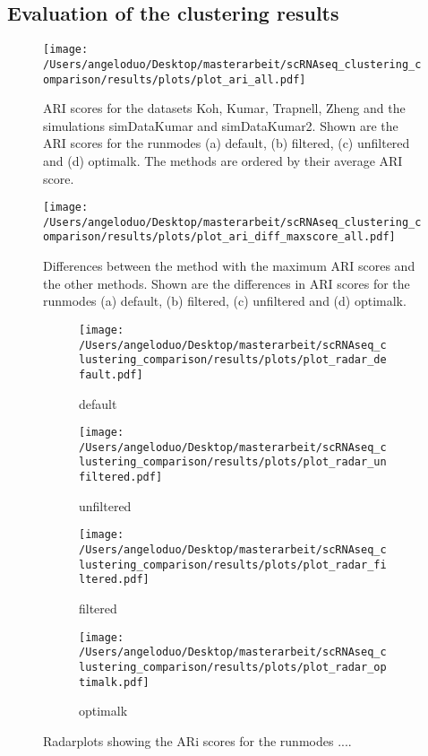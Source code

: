 \documentclass[12pt, a4paper]{article}\usepackage[]{graphicx}\usepackage[]{color}
\begin{document}
\subsection{Evaluation of the clustering results}
\begin{figure}[!h]
\texttt{[image: /Users/angeloduo/Desktop/masterarbeit/scRNAseq\_clustering\_comparison/results/plots/plot\_ari\_all.pdf]}
\caption{ARI scores for the datasets Koh, Kumar, Trapnell, Zheng and the simulations simDataKumar and simDataKumar2. Shown are the ARI scores for the runmodes (a) default, (b) filtered, (c) unfiltered and (d) optimalk. The methods are ordered by their average ARI score. }
\label{fig:ariall}
\end{figure}


\begin{figure}[!h]
\texttt{[image: /Users/angeloduo/Desktop/masterarbeit/scRNAseq\_clustering\_comparison/results/plots/plot\_ari\_diff\_maxscore\_all.pdf]}
\caption{Differences between the method with the maximum ARI scores and the other methods. Shown are the differences in ARI scores for the runmodes (a) default, (b) filtered, (c) unfiltered and (d) optimalk.  }
\label{fig:aridiff1}
\end{figure}

\begin{figure}
\centering
\begin{subfigure}{.5\textwidth}
  \centering
  \texttt{[image: /Users/angeloduo/Desktop/masterarbeit/scRNAseq\_clustering\_comparison/results/plots/plot\_radar\_default.pdf]}
  \caption{default}
  \label{fig:radd}
\end{subfigure}%
\begin{subfigure}{.5\textwidth}
  \centering
  \texttt{[image: /Users/angeloduo/Desktop/masterarbeit/scRNAseq\_clustering\_comparison/results/plots/plot\_radar\_unfiltered.pdf]}
  \caption{unfiltered}
  \label{fig:radu}
\end{subfigure}
\begin{subfigure}{.5\textwidth}
  \centering
  \texttt{[image: /Users/angeloduo/Desktop/masterarbeit/scRNAseq\_clustering\_comparison/results/plots/plot\_radar\_filtered.pdf]}
  \caption{filtered}
  \label{fig:radf}
\end{subfigure}%
\begin{subfigure}{.5\textwidth}
  \centering
  \texttt{[image: /Users/angeloduo/Desktop/masterarbeit/scRNAseq\_clustering\_comparison/results/plots/plot\_radar\_optimalk.pdf]}
  \caption{optimalk}
  \label{fig:rado}
\end{subfigure}
\caption{Radarplots showing the ARi scores for the runmodes .... }
\label{fig:radar}
\end{figure}
\end{document}

